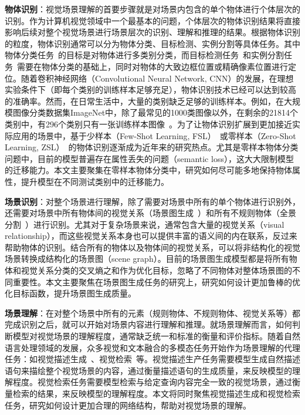 \begin{asparaenum}
\item \textbf{物体识别}：视觉场景理解的首要步骤就是对场景内包含的单个物体进行个体层次的识别。作为计算机视觉领域中一个最基本的问题，个体层次的物体识别结果将直接影响后续对整个视觉场景进行场景层次的识别、理解和推理的结果。根据物体识别的粒度，物体识别通常可以分为物体分类、目标检测、实例分割等具体任务。其中物体分类任务~\cite{russakovsky2015imagenet}的目标是对物体进行多类别分类，而目标检测任务~\cite{ren2015faster,liu2016ssd,redmon2016you}和实例分割任务~\cite{he2017mask}需要在物体分类的基础上，同时对物体的大致边框位置或精确像素位置进行定位。随着卷积神经网络（Convolutional Neural Network, CNN）的发展，在理想实验条件下（即每个类别的训练样本足够充足），物体识别技术已经可以达到较高的准确率。然而，在日常生活中，大量的类别缺乏足够的训练样本。例如，在大规模图像分类数据集ImageNet中，除了最常见的1000类图像以外，在剩余的21814个类别中，有296个类别只有一张训练样本图像~\cite{russakovsky2015imagenet}。为了让物体识别扩展到更加接近实际应用的场景中，基于少样本（Few-Shot Learning, FSL）~\cite{fei2006one}或零样本（Zero-Shot Learning, ZSL）~\cite{lampert2009learning}的物体识别逐渐成为近年来的研究热点。尤其是零样本物体分类问题中，目前的模型普遍存在属性丢失的问题（semantic loss），这大大限制模型的迁移能力。本文主要聚集在零样本物体分类中，研究如何尽可能多地保持物体属性，提升模型在不同测试类别中的迁移能力。

\item \textbf{场景识别}：对整个场景进行理解，除了需要对场景中所有的单个物体进行识别外，还需要对场景中所有物体间的视觉关系（场景图生成~\cite{johnson2015image}）和所有不规则物体（全景分割~\cite{kirillov2019panoptic}）进行识别。尤其对于复杂场景来说，通常包含大量的视觉关系（visual relationship），而这些视觉关系本身也可以提供丰富的语义间的内在联系，反过来帮助物体的识别。结合所有的物体以及物体间的视觉关系，可以将非结构化的视觉场景转换成结构化的场景图（scene graph）。目前的场景图生成模型都是将所有物体和视觉关系分类的交叉熵之和作为优化目标，忽略了不同物体对整体场景图的不同重要性。本文主要聚焦在场景图生成任务的研究上，研究如何设计更加鲁棒的优化目标函数，提升场景图生成质量。

\item \textbf{场景理解}：在对整个场景中所有的元素（规则物体、不规则物体、视觉关系等）都完成识别之后，就可以开始对场景内容进行理解和推理。就场景理解而言，如何判断模型对视觉场景的理解程度，通常缺乏统一和标准的衡量和评价指标。随着自然语言处理领域的发展，众多视觉和文本融合的多模态任务开始作为场景理解的代理任务：如视觉描述生成~\cite{vinyals2015show}、视觉检索~\cite{gao2017tall}等。视觉描述生产任务需要模型生成自然描述语句来描绘整个视觉场景的内容，通过衡量描述语句的生成质量，来反映模型的理解程度。视觉检索任务需要模型检索与给定查询内容完全一致的视觉场景，通过衡量检索的结果，来反映模型的理解程度。本文将同时聚焦视觉描述生成和视觉检索任务，研究如何设计更加合理的网络结构，帮助对视觉场景的理解。


\end{asparaenum}
